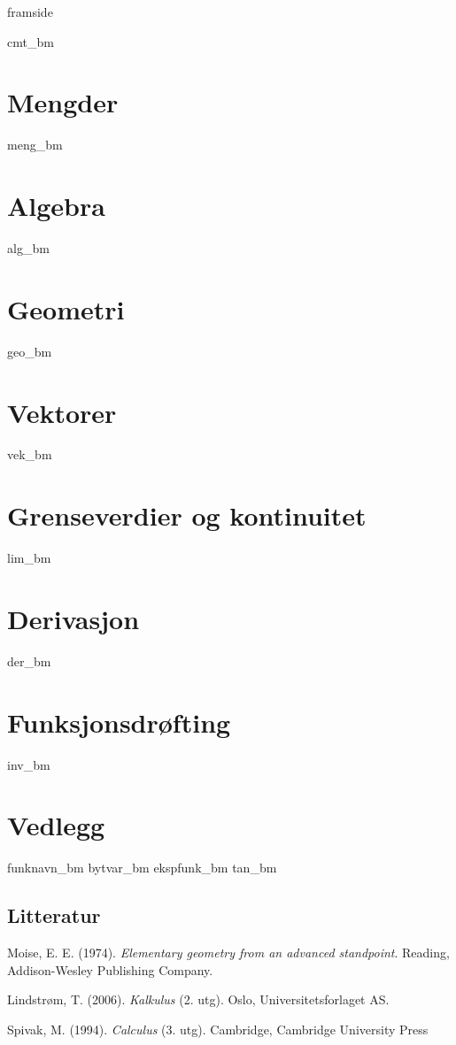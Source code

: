 





\addto\captionsenglish{\renewcommand{\contentsname}{Innhold}}


	
	{framside}
	
	{\footnotesize \tableofcontents}
	\newpage
	
	{cmt_bm}
	
	\chapter{Mengder}
	{meng_bm}
	
	\chapter{Algebra}
	{alg_bm}
	
	\chapter{Geometri}
	{geo_bm}
	
	\chapter{Vektorer}
	{vek_bm}
		
	\chapter{Grenseverdier og kontinuitet}
	{lim_bm}
	
	\chapter{Derivasjon}
	{der_bm}
	
	\chapter{Funksjonsdrøfting}
	{inv_bm}
	
	
	\chapter{Vedlegg}
	{funknavn_bm}
	{bytvar_bm}
	{ekspfunk_bm}
	{tan_bm}
	

	
	\newpage
	\section*{Litteratur}
	Moise, E. E. (1974). \textit{Elementary geometry from an advanced standpoint}. Reading, Addison-Wesley Publishing Company.\vsk
	
	Lindstrøm, T. (2006). \textit{Kalkulus} (2. utg). Oslo, Universitetsforlaget AS.\vsk
	
	Spivak, M. (1994). \textit{Calculus} (3. utg). Cambridge, Cambridge University Press
	
	


